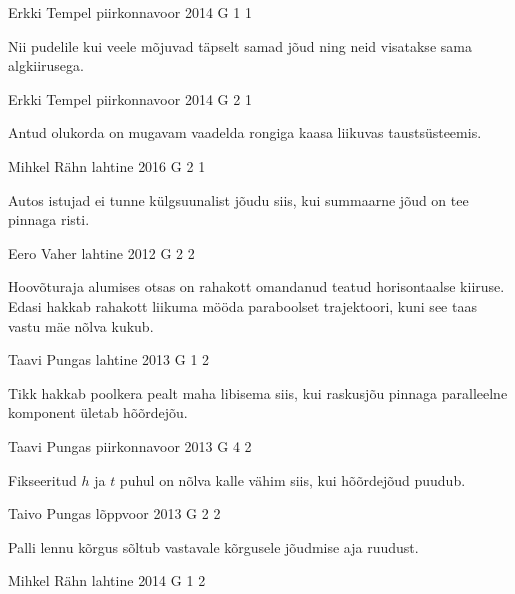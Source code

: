 \documentclass[11pt, twoside]{article}
\begin{document}
{%
{Erkki Tempel} %
{piirkonnavoor} %
{2014} %
{G 1} %
{1} %
{

\ifHint
Nii pudelile kui veele mõjuvad täpselt samad jõud ning neid visatakse sama algkiirusega.
\fi
}

{Erkki Tempel} %
{piirkonnavoor} %
{2014} %
{G 2} %
{1} %
{

\ifHint
Antud olukorda on mugavam vaadelda rongiga kaasa liikuvas taustsüsteemis.
\fi
}

{Mihkel Rähn} %
{lahtine} %
{2016} %
{G 2} %
{1} %
{

\ifHint
Autos istujad ei tunne külgsuunalist jõudu siis, kui summaarne jõud on tee pinnaga risti.
\fi
}

{Eero Vaher} %
{lahtine} %
{2012} %
{G 2} %
{2} %
{

\ifHint
Hoovõturaja alumises otsas on rahakott omandanud teatud horisontaalse kiiruse. Edasi hakkab rahakott liikuma mööda paraboolset trajektoori, kuni see taas vastu mäe nõlva kukub.
\fi
}

{Taavi Pungas} %
{lahtine} %
{2013} %
{G 1} %
{2} %
{

\ifHint
Tikk hakkab poolkera pealt maha libisema siis, kui raskusjõu pinnaga paralleelne komponent ületab hõõrdejõu.
\fi
}

{Taavi Pungas} %
{piirkonnavoor} %
{2013} %
{G 4} %
{2} %
{

\ifHint
Fikseeritud $h$ ja $t$ puhul on nõlva kalle vähim siis, kui hõõrdejõud puudub.
\fi
}

{Taivo Pungas} %
{lõppvoor} %
{2013} %
{G 2} %
{2} %
{

\ifHint
Palli lennu kõrgus sõltub vastavale kõrgusele jõudmise aja ruudust.
\fi
}

{Mihkel Rähn} %
{lahtine} %
{2014} %
{G 1} %
{2} %
{

}}
\end{document}
